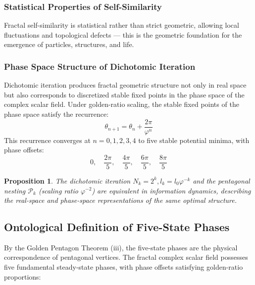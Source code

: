 \documentclass[12pt,a4paper,twocolumn]{article}
\renewcommand{\phi}{\varphi}
\newtheorem{proposition}[theorem]{Proposition}
\begin{document}
\subsubsection{Statistical Properties of Self-Similarity}
Fractal self-similarity is statistical rather than strict geometric, allowing local fluctuations and topological defects --- this is the geometric foundation for the emergence of particles, structures, and life.

\subsubsection{Phase Space Structure of Dichotomic Iteration}
Dichotomic iteration produces fractal geometric structure not only in real space but also corresponds to discretized stable fixed points in the phase space of the complex scalar field. Under golden-ratio scaling, the stable fixed points of the phase space satisfy the recurrence:
\[
\theta_{n+1} = \theta_n + \frac{2\pi}{\phi^n}
\]
This recurrence converges at $n=0,1,2,3,4$ to five stable potential minima, with phase offsets:
\[
0,\quad \frac{2\pi}{5},\quad \frac{4\pi}{5},\quad \frac{6\pi}{5},\quad \frac{8\pi}{5}
\]

\begin{proposition}
The dichotomic iteration $N_k = 2^k, l_k = l_0 \phi^{-k}$ and the pentagonal nesting $\mathcal{P}_k$ (scaling ratio $\phi^{-2}$) are equivalent in information dynamics, describing the real-space and phase-space representations of the same optimal structure.
\end{proposition}

\subsection{Ontological Definition of Five-State Phases}
\label{subsec:five_states}

By the Golden Pentagon Theorem (iii), the five-state phases are the physical correspondence of pentagonal vertices. The fractal complex scalar field possesses five fundamental steady-state phases, with phase offsets satisfying golden-ratio proportions:
\end{document}
